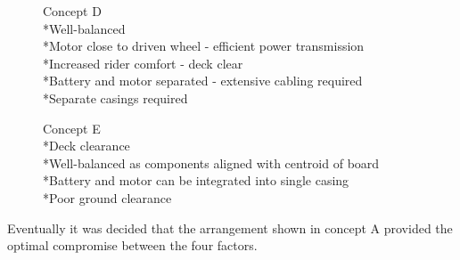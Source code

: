 \documentclass[journal,10pt]{IEEEtran}
\begin{document}
        \begin{figure}[H]
                \centering
                \caption{Concept D
                \\*Well-balanced
                \\*Motor close to driven wheel - efficient power transmission
                \\*Increased rider comfort - deck clear
                \\*Battery and motor separated - extensive cabling required
                \\*Separate casings required}
                \label{Fig:ConceptD}
            \end{figure} 
        \begin{figure}[H]
                \centering
                \caption{Concept E
                \\*Deck clearance
                \\*Well-balanced as components aligned with centroid of board
                \\*Battery and motor can be integrated into single casing
                \\*Poor ground clearance
                }
                \label{Fig:ConceptE}
            \end{figure}
        Eventually it was decided that the arrangement shown in concept A provided the optimal compromise between the four factors.
\end{document}
